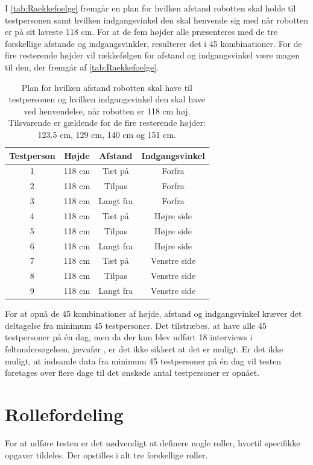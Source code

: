 I \autoref{tab:Raekkefoelge} fremgår en plan for hvilken afstand robotten skal holde til testpersonen samt hvilken indgangsvinkel den skal henvende sig med når robotten er på sit laveste 118 cm. For at de fem højder alle præsenteres med de tre forskellige afstande og indgangsvinkler, resulterer det i 45 kombinationer. For de fire resterende højder vil rækkefølgen for afstand og indgangsvinkel være magen til den, der fremgår af \autoref{tab:Raekkefoelge}.    
%
\begin{table}[H]
	\centering 
	\begin{tabular}{c|c|c|c}
		Testperson  & Højde & Afstand & Indgangsvinkel \\\hline
		1   & 118 cm & Tæt på & Forfra  \\\hline
		2   & 118 cm & Tilpas & Forfra \\ \hline
		3   & 118 cm & Langt fra  & Forfra \\ \hline
		4   & 118 cm & Tæt på & Højre side \\ \hline
		5   & 118 cm & Tilpas & Højre side \\ \hline
		6   & 118 cm & Langt fra & Højre side \\ \hline
		7   & 118 cm & Tæt på & Venstre side \\ \hline
		8   & 118 cm & Tilpas & Venstre side \\ \hline
		9   & 118 cm & Langt fra  & Venstre side 
	\end{tabular} 
	\caption{Plan for hvilken afstand robotten skal have til testpersonen og hvilken indgangsvinkel den skal have ved henvendelse, når robotten er 118 cm høj. Tilsvarende er gældende for de fire resterende højder: 123.5 cm, 129 cm, 140 cm og 151 cm.}
	\label{tab:Raekkefoelge}       
\end{table}
\noindent
%
For at opnå de 45 kombinationer af højde, afstand og indgangsvinkel kræver det deltagelse fra minimum 45 testpersoner. Det tilstræbes, at have alle 45 testpersoner på én dag, men da der kun blev udført 18 interviews i feltundersøgelsen, jævnfør , er det ikke sikkert at det er muligt. Er det ikke muligt, at indsamle data fra minimum 45 testpersoner på én dag vil testen foretages over flere dage til det ønskede antal testpersoner er opnået.   

\section{Rollefordeling}
\label{TestAfSkalaRollefordeling}
%
For at udføre testen er det nødvendigt at definere nogle roller, hvortil specifikke opgaver tildeles. Der opstilles i alt tre forskellige roller. 
%
